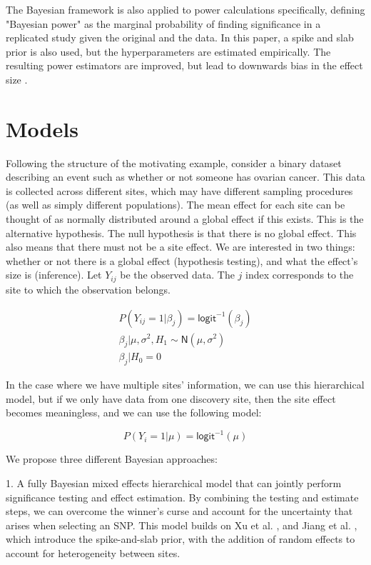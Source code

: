 \documentclass[AMA,STIX1COL]{WileyNJD-v2}\usepackage[]{graphicx}\usepackage[]{color}
\begin{document}
The Bayesian framework is also applied to power calculations specifically, defining "Bayesian power" as the marginal probability of finding significance in a replicated study given the original and the data. In this paper, a spike and slab prior is also used, but the hyperparameters are estimated empirically. The resulting power estimators are improved, but lead to downwards bias in the effect size \cite{jiang2016power}.

\section{Models}\label{sec:models}


Following the structure of the motivating example, consider a binary dataset describing an event such as whether or not someone has ovarian cancer. This data is collected across different sites, which may have different sampling procedures (as well as simply different populations). The mean effect for each site can be thought of as normally distributed around a global effect if this exists. This is the alternative hypothesis. The null hypothesis is that there is no global effect. This also means that there must not be a site effect. We are interested in two things: whether or not there is a global effect (hypothesis testing), and what the effect's size is (inference). Let $Y_{ij}$ be the observed data. The $j$ index corresponds to the site to which the observation belongs. 

\begin{gather}\label{eq1}
P(Y_{ij}=1| \beta_j) = \textsf{logit}^{-1}(\beta_{j})\\
\beta_{j}|\mu, \sigma^2,H_1 \sim \textsf{N}(\mu, \sigma^{2})\\
\beta_{j}|H_0 = 0
\end{gather}

In the case where we have multiple sites' information, we can use this hierarchical model, but if we only have data from one discovery site, then the site effect becomes meaningless, and we can use the following model:

\begin{equation}\label{eq2}
P(Y_{i}=1|\mu) = \textsf{logit}^{-1}(\mu)
\end{equation}

We propose three different Bayesian approaches: 

1. A fully Bayesian mixed effects hierarchical model that can jointly perform significance testing and effect estimation. By combining the testing and estimate steps, we can overcome the winner's curse and account for the uncertainty that arises when selecting an SNP. This model builds on Xu et al. \cite{xu2011bayesian}, and Jiang et al. \cite{jiang2016power}, which introduce the spike-and-slab prior, with the addition of random effects to account for heterogeneity between sites.
\end{document}
